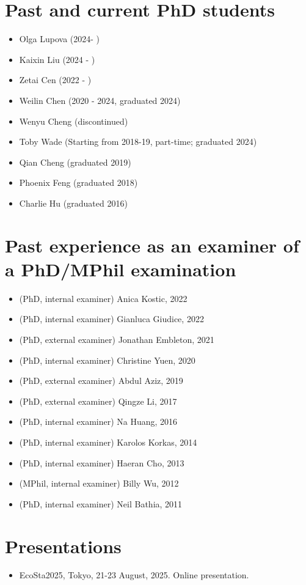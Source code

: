 \documentclass[overlapped,line,letterpaper]{res}
\begin{document}
\begin{resume}
\section{Past and current PhD students}
\begin{itemize}
\item Olga Lupova (2024- )
\item Kaixin Liu (2024 - )
\item Zetai Cen (2022 - )
\item Weilin Chen (2020 - 2024, graduated 2024)
\item Wenyu Cheng (discontinued)
\item Toby Wade (Starting from 2018-19, part-time; graduated 2024)
\item Qian Cheng (graduated 2019)
\item Phoenix Feng (graduated 2018)
\item Charlie Hu (graduated 2016)
\end{itemize}


\section{Past experience as an examiner of a PhD/MPhil examination}
\begin{itemize}
  \item (PhD, internal examiner) Anica Kostic, 2022
  \item  (PhD, internal examiner) Gianluca Giudice, 2022
  \item  (PhD, external examiner) Jonathan Embleton, 2021
  \item (PhD, internal examiner) Christine Yuen, 2020
  \item (PhD, external examiner)  Abdul Aziz, 2019
  \item (PhD, external examiner) Qingze Li, 2017
  \item  (PhD, internal examiner) Na Huang, 2016
  \item (PhD, internal examiner) Karolos Korkas, 2014
  \item (PhD, internal examiner) Haeran Cho, 2013
  \item (MPhil, internal examiner) Billy Wu, 2012
  \item (PhD, internal examiner) Neil Bathia, 2011
\end{itemize}



\section{Presentations}
\begin{itemize}
\item[$\bullet$] EcoSta2025, Tokyo, 21-23 August, 2025. Online presentation.


\end{itemize}
\end{resume}
\end{document}
